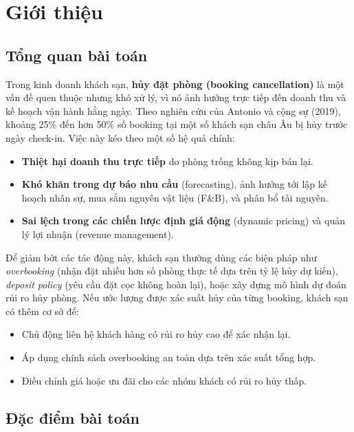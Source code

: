 \documentclass[12pt, a4paper]{article}
\begin{document}
\section{Giới thiệu}

\subsection{Tổng quan bài toán}

Trong kinh doanh khách sạn, \textbf{hủy đặt phòng (booking cancellation)} là một vấn đề quen thuộc nhưng khó xử lý, vì nó ảnh hưởng trực tiếp đến doanh thu và kế hoạch vận hành hằng ngày. Theo nghiên cứu của Antonio và cộng sự (2019), khoảng 25\% đến hơn 50\% số booking tại một số khách sạn châu Âu bị hủy trước ngày check-in. Việc này kéo theo một số hệ quả chính:

\begin{itemize}
    \item \textbf{Thiệt hại doanh thu trực tiếp} do phòng trống không kịp bán lại.
    \item \textbf{Khó khăn trong dự báo nhu cầu} (forecasting), ảnh hưởng tới lập kế hoạch nhân sự, mua sắm nguyên vật liệu (F\&B), và phân bổ tài nguyên.
    \item \textbf{Sai lệch trong các chiến lược định giá động} (dynamic pricing) và quản lý lợi nhuận (revenue management).
\end{itemize}

Để giảm bớt các tác động này, khách sạn thường dùng các biện pháp như \emph{overbooking} (nhận đặt nhiều hơn số phòng thực tế dựa trên tỷ lệ hủy dự kiến), \emph{deposit policy} (yêu cầu đặt cọc không hoàn lại), hoặc xây dựng mô hình dự đoán rủi ro hủy phòng. Nếu ước lượng được xác suất hủy của từng booking, khách sạn có thêm cơ sở để:

\begin{itemize}
    \item Chủ động liên hệ khách hàng có rủi ro hủy cao để xác nhận lại.
    \item Áp dụng chính sách overbooking an toàn dựa trên xác suất tổng hợp.
    \item Điều chỉnh giá hoặc ưu đãi cho các nhóm khách có rủi ro hủy thấp.
\end{itemize}

\subsection{Đặc điểm bài toán}
\end{document}
